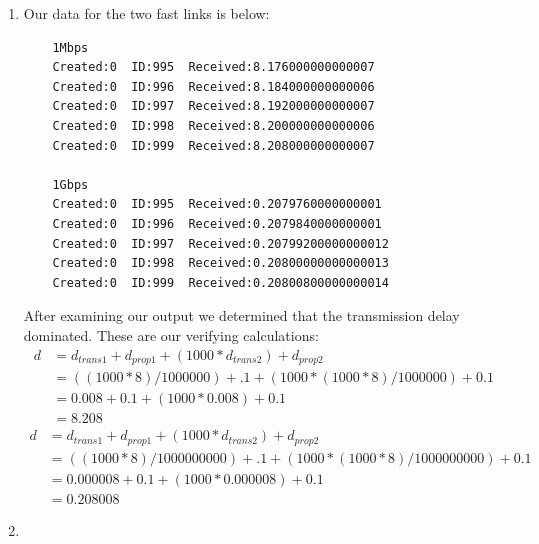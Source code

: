 \documentclass[fleqn,11pt]{article}
\begin{document}
\begin{enumerate}
  \item 

  Our data for the two fast links is below:
  \begin{lstlisting}
    1Mbps
    Created:0  ID:995  Received:8.176000000000007
    Created:0  ID:996  Received:8.184000000000006
    Created:0  ID:997  Received:8.192000000000007
    Created:0  ID:998  Received:8.200000000000006
    Created:0  ID:999  Received:8.208000000000007

    1Gbps
    Created:0  ID:995  Received:0.2079760000000001
    Created:0  ID:996  Received:0.2079840000000001
    Created:0  ID:997  Received:0.20799200000000012
    Created:0  ID:998  Received:0.20800000000000013
    Created:0  ID:999  Received:0.20800800000000014
  \end{lstlisting}
  After examining our output we determined that the transmission delay dominated.
  \newline
  These are our verifying calculations:
  \begin{align*}
    d &= d_{trans1} + d_{prop1} + (1000 * d_{trans2}) + d_{prop2}\\
      &= ((1000*8)/1000000) + .1 + (1000 * (1000*8)/1000000) + 0.1\\
      &= 0.008 + 0.1 + (1000 * 0.008) + 0.1\\
      &= 8.208
  \end{align*}
  \begin{align*}
    d &= d_{trans1} + d_{prop1} + (1000 * d_{trans2}) + d_{prop2}\\
      &= ((1000*8)/1000000000) + .1 + (1000 * (1000*8)/1000000000) + 0.1\\
      &= 0.000008 + 0.1 + (1000 * 0.000008) + 0.1\\
      &= 0.208008
  \end{align*}

  \item 


\end{enumerate}
\end{document}
